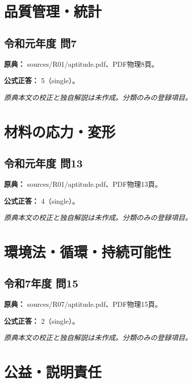 \section{品質管理・統計}

\subsection{令和元年度 問7}
\label{q:r01-reg-apt-07}

\noindent\textbf{原典：} sources/R01/aptitude.pdf、PDF物理8頁。

\textbf{公式正答：} 5（single）。

\par\textit{原典本文の校正と独自解説は未作成。分類のみの登録項目。}

\section{材料の応力・変形}

\subsection{令和元年度 問13}
\label{q:r01-reg-apt-13}

\noindent\textbf{原典：} sources/R01/aptitude.pdf、PDF物理13頁。

\textbf{公式正答：} 4（single）。

\par\textit{原典本文の校正と独自解説は未作成。分類のみの登録項目。}

\section{環境法・循環・持続可能性}

\subsection{令和7年度 問15}
\label{q:r07-reg-apt-15}

\noindent\textbf{原典：} sources/R07/aptitude.pdf、PDF物理15頁。

\textbf{公式正答：} 2（single）。

\par\textit{原典本文の校正と独自解説は未作成。分類のみの登録項目。}

\section{公益・説明責任}

